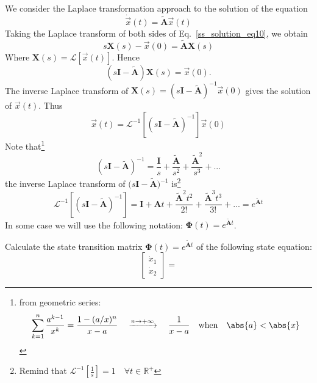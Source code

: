 \documentclass[12pt,a4paper,oneside]{book}
\begin{document}
\begin{onehalfspace}
We consider the Laplace transformation approach to the solution of the equation
\begin{equation}\label{ss_solution_eq10}
	\dot{\vec{x}}(t) = \tilde{\mathbf{A}} \vec{x}(t)
\end{equation}
Taking the Laplace transform of both sides of Eq.~\eqref{ss_solution_eq10}, we 
obtain
\begin{equation}
	s\mathbf{X}(s) - \vec{x}(0) = \tilde{\mathbf{A}} \mathbf{X}(s)
\end{equation}
Where $\mathbf{X}(s) = \mathcal{L}\left[ \vec{x}(t)\right]$. Hence
\begin{equation}
	\left( s\mathbf{I} - \tilde{\mathbf{A}}\right) \mathbf{X}(s)=\vec{x}(0).
\end{equation}
The inverse Laplace transform of $\mathbf{X}(s)= \left(s\mathbf{I}- 
\tilde{\mathbf{A}} \right)^{-1}\vec{x}(0)$ gives the solution of 
$\vec{x}(t)$. Thus 
\begin{equation}
	\vec{x}(t)= \mathcal{L}^{-1}\left[ \left(s\mathbf{I}-\tilde{\mathbf{A}} \right)^{-1} \right]\vec{x}(0) 
\end{equation}
Note that\footnote{from geometric series: $$ \sum_{k=1}^{n}\frac{a^{k-1}}{x^k} = \frac{1-(a/x)^n}{x-a}\quad\xrightarrow{n\rightarrow+\infty}\quad\frac{1}{x-a}\quad\text{when}\quad\abs{a}<\abs{x}$$}
\begin{equation}
	\left(s\mathbf{I}-\tilde{\mathbf{A}} \right)^{-1} = \frac{\mathbf{I}}{s}+\frac{\tilde{\mathbf{A}}}{s^2}+\frac{\tilde{\mathbf{A}}^2}{s^3}+...
\end{equation}
the inverse Laplace transform of $\big(s\mathbf{I}- \tilde{\mathbf{A}} 
\big)^{-1}$ is\footnote{Remind that 
$\mathcal{L}^{-1}\left[\frac{1}{s}\right]=1\quad\forall 
t\in\mathbb{R}^+$}
\begin{equation}
	\mathcal{L}^{-1}\left[ \left(s\mathbf{I}-\tilde{\mathbf{A}} \right)^{-1} \right] = \mathbf{I} + \mathbf{A}t+\frac{\tilde{\mathbf{A}}^2t^2}{2!}+\frac{\tilde{\mathbf{A}}^3t^3}{3!}+...=e^{\tilde{\mathbf{A}}t}
\end{equation}
In some case we will use the following notation: $\mathbf{\Phi}(t) = 
e^{\tilde{\mathbf{A}}t}$. 
\begin{example}
	Calculate the state transition matrix  $\mathbf{\Phi}(t) = e^{\tilde{\mathbf{A}}t}$ of the following state equation:
	\begin{equation}
		\left[ \begin{matrix}
			\dot{x}_1 \\[6pt]
			\dot{x}_2
		\end{matrix}\right] = 

\end{equation}
\end{example}
\end{onehalfspace}
\end{document}
